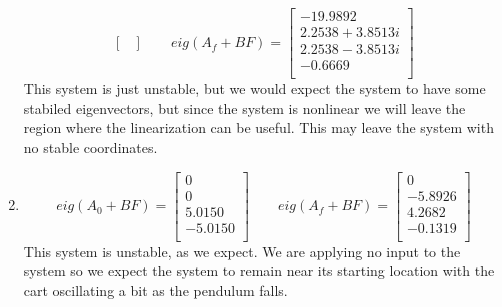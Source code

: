 \documentclass{article}
\begin{document}
\begin{enumerate}[1)]
$$\begin{bmatrix}
\end{bmatrix}
\qquad
eig(A_f + BF) =
\begin{bmatrix}
-19.9892 \\
2.2538 + 3.8513i \\
2.2538 - 3.8513i \\
-0.6669 \\
\end{bmatrix}
$$
This system is just unstable, but we would expect the system to have some stabiled eigenvectors, but since the system is nonlinear we will leave the region where the linearization can be useful.
This may leave the system with no stable coordinates.
\item
$$ eig(A_0 + BF) =
\begin{bmatrix}
0 \\
0 \\
5.0150 \\
-5.0150 \\
\end{bmatrix}
\qquad
eig(A_f + BF) =
\begin{bmatrix}
0 \\
-5.8926 \\
4.2682 \\
-0.1319 \\
\end{bmatrix}
$$
This system is unstable, as we expect.
We are applying no input to the system so we expect the system to remain near its starting location with the cart oscillating a bit as the pendulum falls.
\end{enumerate}
\end{document}
